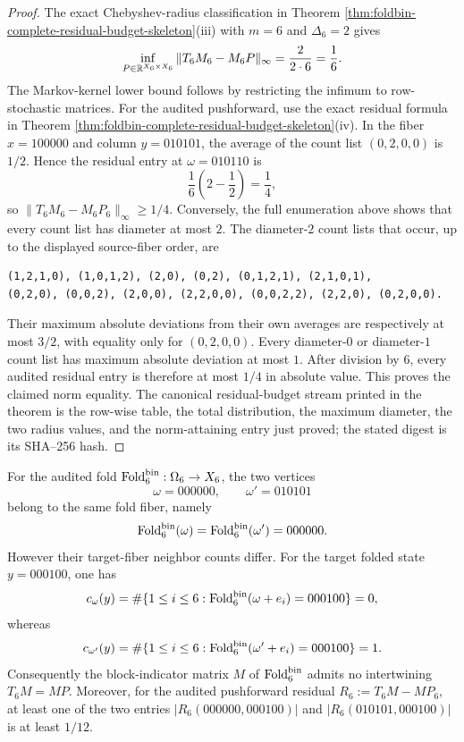 \begin{proof}
The exact Chebyshev-radius classification in Theorem \ref{thm:foldbin-complete-residual-budget-skeleton}\textup{(iii)} with \(m=6\) and \(\Delta_6=2\) gives
\[
\inf_{P\in\mathbb{R}^{X_6\times X_6}}\|T_6M_6-M_6P\|_\infty=\frac{2}{2\cdot6}=\frac16.
\]
The Markov-kernel lower bound follows by restricting the infimum to row-stochastic matrices.  For the audited pushforward, use the exact residual formula in Theorem \ref{thm:foldbin-complete-residual-budget-skeleton}\textup{(iv)}.  In the fiber \(x=100000\) and column \(y=010101\), the average of the count list \((0,2,0,0)\) is \(1/2\).  Hence the residual entry at \(\omega=010110\) is
\[
\frac{1}{6}\left(2-\frac12\right)=\frac14,
\]
so \(\|T_6M_6-M_6P_6\|_\infty\ge1/4\).  Conversely, the full enumeration above shows that every count list has diameter at most \(2\).  The diameter-\(2\) count lists that occur, up to the displayed source-fiber order, are
\begin{center}
\begin{minipage}{0.92\linewidth}
\begin{Verbatim}[breaklines=true,breakanywhere=true,fontsize=\scriptsize]
(1,2,1,0), (1,0,1,2), (2,0), (0,2), (0,1,2,1), (2,1,0,1),
(0,2,0), (0,0,2), (2,0,0), (2,2,0,0), (0,0,2,2), (2,2,0), (0,2,0,0).
\end{Verbatim}
\end{minipage}
\end{center}
Their maximum absolute deviations from their own averages are respectively at most \(3/2\), with equality only for \((0,2,0,0)\).  Every diameter-\(0\) or diameter-\(1\) count list has maximum absolute deviation at most \(1\).  After division by \(6\), every audited residual entry is therefore at most \(1/4\) in absolute value.  This proves the claimed norm equality.  The canonical residual-budget stream printed in the theorem is the row-wise table, the total distribution, the maximum diameter, the two radius values, and the norm-attaining entry just proved; the stated digest is its SHA--256 hash. \qedhere
\end{proof}
\begin{proposition}\label{prop:foldbin6-explicit-nonintertwining-witness}
For the audited fold \(\operatorname{Fold}_6^{\mathrm{bin}}:\Omega_6\to X_6\), the two vertices
\[
\omega=000000,
\qquad
\omega'=010101
\]
belong to the same fold fiber, namely
\[
\operatorname{Fold}_6^{\mathrm{bin}}(\omega)=\operatorname{Fold}_6^{\mathrm{bin}}(\omega')=000000.
\]
However their target-fiber neighbor counts differ.  For the target folded state \(y=000100\), one has
\[
c_\omega(y)=\#\{1\le i\le6:\operatorname{Fold}_6^{\mathrm{bin}}(\omega+e_i)=000100\}=0,
\]
whereas
\[
c_{\omega'}(y)=\#\{1\le i\le6:\operatorname{Fold}_6^{\mathrm{bin}}(\omega'+e_i)=000100\}=1.
\]
Consequently the block-indicator matrix \(M\) of \(\operatorname{Fold}_6^{\mathrm{bin}}\) admits no intertwining \(T_6M=MP\).  Moreover, for the audited pushforward residual \(R_6:=T_6M-MP_6\), at least one of the two entries \(|R_6(000000,000100)|\) and \(|R_6(010101,000100)|\) is at least \(1/12\).
\end{proposition}

